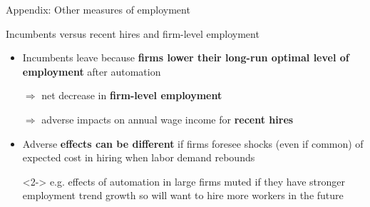 \documentclass[aspectratio=169]{beamer}
\begin{document}

\begin{frame}
\begin{center}
{\Large Appendix: Other measures of employment}
\end{center}
\end{frame}

\begin{frame}{Incumbents versus recent hires and firm-level employment} \label{otheremp} 
\begin{itemize}
    \item Incumbents leave because \textbf{firms lower their long-run optimal level of employment} after automation \medskip
    \item[] $ \Rightarrow $ net decrease in \textbf{firm-level employment} \medskip 
    \item[] $ \Rightarrow $ adverse impacts on annual wage income for \textbf{recent hires} \medskip
    \item<2-> Adverse \textbf{effects can be different} if firms foresee shocks (even if common) of expected cost in hiring when labor demand rebounds \medskip
    \item[]<2-> e.g. effects of automation in large firms muted if they have stronger employment trend growth so will want to hire more workers in the future
\end{itemize}
\end{frame}
\end{document}
